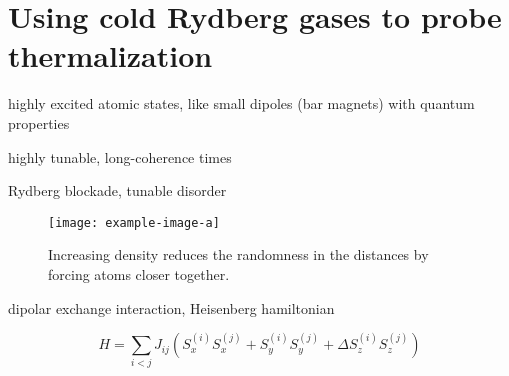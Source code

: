 \section{Using cold Rydberg gases to probe thermalization}\label{sec:Rydberg-experiment}
highly excited atomic states, like small dipoles  (bar magnets) with quantum properties

highly tunable, long-coherence times

Rydberg blockade, tunable disorder

\begin{figure}[htb]
	\centering
	\texttt{[image: example-image-a]}
	\caption{Increasing density reduces the randomness in the distances by forcing atoms closer together.}
\end{figure}

dipolar exchange interaction, Heisenberg hamiltonian

\begin{equation}\label{eq:heisenberg-hamiltonian}
	H = \sum_{i<j} J_{ij}\left(S_x^{(i)}S_x^{(j)} + S_y^{(i)}S_y^{(j)} + \Delta S_z^{(i)}S_z^{(j)}\right)
\end{equation}